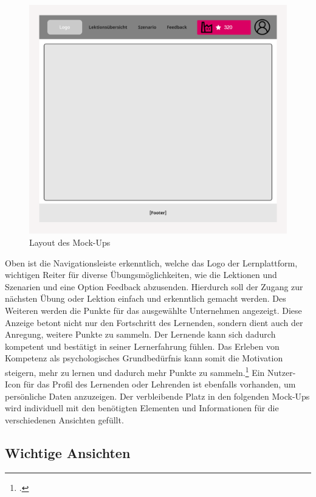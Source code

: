 \begin{figure}[H]
    \centering
    \includegraphics[width=1.0\textwidth]{assets/screenshots/mockups/Layout-MockUp.png}
    \caption{Layout des Mock-Ups}
    \label{fig:Layout Mock-Up}
\end{figure}

Oben ist die Navigationsleiste erkenntlich, welche das Logo der Lernplattform, wichtigen Reiter für diverse Übungsmöglichkeiten, wie die Lektionen und Szenarien und eine Option Feedback abzusenden. Hierdurch soll der Zugang zur nächsten Übung oder Lektion einfach und erkenntlich gemacht werden.
Des Weiteren werden die Punkte für das ausgewählte Unternehmen angezeigt. Diese Anzeige betont nicht nur den Fortschritt des Lernenden, sondern dient auch der Anregung, weitere Punkte zu sammeln. Der Lernende kann sich dadurch kompetent und bestätigt in seiner Lernerfahrung fühlen. Das Erleben von Kompetenz als psychologisches Grundbedürfnis kann somit die Motivation steigern, mehr zu lernen und dadurch mehr Punkte zu sammeln.\footcite[vgl.][S.516-517]{BolognaDigital}
Ein Nutzer-Icon für das Profil des Lernenden oder Lehrenden ist ebenfalls vorhanden, um persönliche Daten anzuzeigen. 
Der verbleibende Platz in den folgenden Mock-Ups wird individuell mit den benötigten Elementen und Informationen für die verschiedenen Ansichten gefüllt.

\subsection{Wichtige Ansichten}

